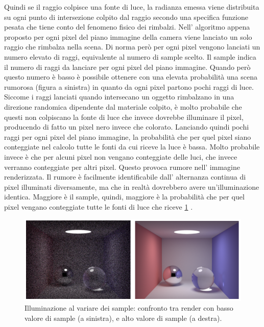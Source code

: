 Quindi se il raggio colpisce una fonte di luce, la radianza emessa viene distribuita su ogni punto di intersezione colpito dal raggio secondo una specifica funzione pesata che tiene conto del fenomeno fisico dei rimbalzi. 
Nell’ algoritmo appena proposto per ogni pixel del piano immagine della camera viene lanciato un solo raggio che rimbalza nella scena. Di norma però per ogni pixel vengono lanciati un numero elevato di raggi, equivalente al numero di sample scelto. Il sample indica il numero di raggi da lanciare per ogni pixel del piano immagine.
Quando però questo numero è basso è possibile ottenere con una elevata probabilità una scena rumorosa (figura a sinistra) in quanto da ogni pixel partono pochi raggi di luce. 
Siccome i raggi lanciati quando intersecano un oggetto rimbalzano in una direzione randomica dipendente dal materiale colpito, è molto probabile che questi non colpiscano la fonte di luce che invece dovrebbe illuminare il pixel, producendo di fatto un pixel nero invece che colorato. 
Lanciando quindi pochi raggi per ogni pixel del piano immagine, la probabilità che per quel pixel siano conteggiate nel calcolo tutte le fonti da cui riceve la luce è bassa. 
Molto probabile invece è che per alcuni pixel non vengano conteggiate delle luci, che invece verranno conteggiate per altri pixel. Questo provoca rumore nell’ immagine renderizzata. 
Il rumore è facilmente identificabile dall’ alternanza continua di pixel illuminati diversamente, ma che in realtà dovrebbero avere un’illuminazione identica.
Maggiore è il sample, quindi, maggiore è la probabilità che per quel pixel vengano conteggiate tutte le fonti di luce che riceve \ref{fig:stato_arte_effetto_sampling} .
\\
\begin{figure}[htb]
 \centering
 \includegraphics[width=0.8\linewidth]{images/chapter_stato_arte/stato_arte_effetto_sampling.png}\hfill
 \caption[Illuminazione al variare dei sample]{Illuminazione al variare dei sample: confronto tra render con basso valore di sample (a sinistra), e alto valore di sample (a destra).}
 \label{fig:stato_arte_effetto_sampling}
\end{figure}

